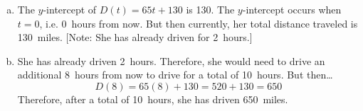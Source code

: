 \documentclass[12pt,letterpaper]{exam}
\begin{document}
\begin{questions}
{\begin{enumerate}[(a)]
\item The $y$-intercept of $D(t)= 65t + 130$ is 130. The $y$-intercept occurs when $t= 0$, i.e. 0~hours from now. But then currently, her total distance traveled is 130~miles. [Note: She has already driven for 2~hours.] \pspace

\item She has already driven 2~hours. Therefore, she would need to drive an additional 8~hours from now to drive for a total of 10~hours. But then\dots
	\[
	D(8)= 65(8) + 130= 520 + 130= 650 
	\]
Therefore, after a total of 10~hours, she has driven 650~miles. 
\end{enumerate}
}


\end{questions}
\end{document}
